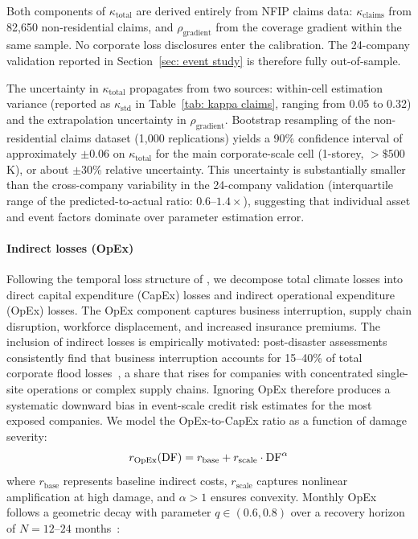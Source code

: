 Both components of $\kappa_{\text{total}}$ are derived entirely from NFIP claims data: $\kappa_{\text{claims}}$ from 82{,}650 non-residential claims, and $\rho_{\text{gradient}}$ from the coverage gradient within the same sample. No corporate loss disclosures enter the calibration. The 24-company validation reported in Section~\ref{sec: event study} is therefore fully out-of-sample.

The uncertainty in $\kappa_{\text{total}}$ propagates from two sources: within-cell estimation variance (reported as $\kappa_\text{std}$ in Table~\ref{tab: kappa claims}, ranging from 0.05 to 0.32) and the extrapolation uncertainty in $\rho_{\text{gradient}}$. Bootstrap resampling of the non-residential claims dataset (1{,}000 replications) yields a 90\% confidence interval of approximately $\pm$0.06 on $\kappa_{\text{total}}$ for the main corporate-scale cell (1-storey, $>\$500$K), or about $\pm$30\% relative uncertainty. This uncertainty is substantially smaller than the cross-company variability in the 24-company validation (interquartile range of the predicted-to-actual ratio: $0.6$--$1.4\times$), suggesting that individual asset and event factors dominate over parameter estimation error.

\paragraph{Indirect losses (OpEx)}
Following the temporal loss structure of \cite{hallegatte2015indirect}, we decompose total climate losses into direct capital expenditure (CapEx) losses and indirect operational expenditure (OpEx) losses. The OpEx component captures business interruption, supply chain disruption, workforce displacement, and increased insurance premiums. The inclusion of indirect losses is empirically motivated: post-disaster assessments consistently find that business interruption accounts for 15--40\% of total corporate flood losses~\cite{hallegatte2015indirect, hallegatte2010economics}, a share that rises for companies with concentrated single-site operations or complex supply chains. Ignoring OpEx therefore produces a systematic downward bias in event-scale credit risk estimates for the most exposed companies. We model the OpEx-to-CapEx ratio as a function of damage severity:
\begin{equation*}
    r_{\text{OpEx}}(\text{DF}) = r_{\text{base}} + r_{\text{scale}} \cdot \text{DF}^{\alpha}
\end{equation*}
where $r_{\text{base}}$ represents baseline indirect costs, $r_{\text{scale}}$ captures nonlinear amplification at high damage, and $\alpha > 1$ ensures convexity. Monthly OpEx follows a geometric decay with parameter $q \in (0.6, 0.8)$ over a recovery horizon of $N = 12$--$24$ months~\cite{hallegatte2010economics}:

